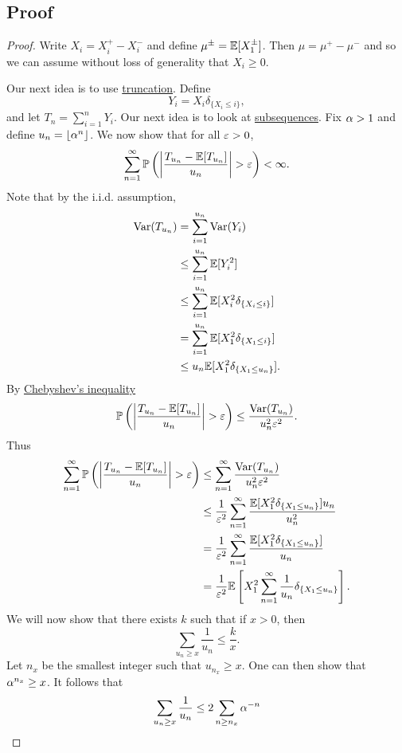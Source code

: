 \subsection{Proof}
\begin{proof}
    Write $X_i = X_i^+-X_i^-$ and define $\mu^{\pm} = {\mathbb{E}}[X_1^\pm]$. Then $\mu = \mu^+ - \mu^-$ and so we can assume without loss of generality that $X_i \ge 0$.

    Our next idea is to use \underline{truncation}. Define
    \[Y_i = X_i \delta_{\{X_i \le i\}}, \]
    and let $T_n = \sum_{i=1}^n Y_i$. Our next idea is to look at \underline{subsequences}. Fix ${\alpha} >1$ and define $u_n = \lfloor {\alpha}^n \rfloor$. We now show that for all $\varepsilon > 0$,
    \[\sum_{n=1}^\infty {\mathbb{P}}\left({\left\lvert\frac{T_{u_n}-{\mathbb{E}}[T_{u_n}]}{u_n}\right\rvert}>\varepsilon \right)< \infty. \] 
    Note that by the i.i.d. assumption,
    \begin{align*}
        \operatorname{Var}(T_{u_n})&=\sum_{i=1}^{u_n}\operatorname{Var}(Y_i)\\
        &\le \sum_{i=1}^{u_n}{\mathbb{E}}[Y_i^2]\\
        &\le \sum_{i=1}^{u_n}{\mathbb{E}}[X_i^2\delta_{\{X_i \le i\}}]\\
        &=\sum_{i=1}^{u_n}{\mathbb{E}}[X_1^2\delta_{\{X_1 \le i\}}]\\
        &\le u_n {\mathbb{E}}[X_1^2 \delta_{\{X_1\le u_n\}}].
    \end{align*}
    By \underline{Chebyshev's inequality} 
    \[{\mathbb{P}}\left({\left\lvert\frac{T_{u_n}-{\mathbb{E}}[T_{u_n}]}{u_n}\right\rvert}>\varepsilon \right) \le \frac{\operatorname{Var}(T_{u_n})}{u_n^2\varepsilon^2}. \]
    Thus 
    \begin{align*}
        \sum_{n=1}^\infty {\mathbb{P}}\left({\left\lvert\frac{T_{u_n}-{\mathbb{E}}[T_{u_n}]}{u_n}\right\rvert}>\varepsilon \right)&\le \sum_{n=1}^\infty  \frac{\operatorname{Var}(T_{u_n})}{u_n^2\varepsilon^2}\\
        &\le \frac{1}{\varepsilon^2}\sum_{n=1}^\infty \frac{{\mathbb{E}}[X_1^2\delta_{\{X_1\le u_n\}}]u_n}{u_n^2}\\
        & =  \frac{1}{\varepsilon^2}\sum_{n=1}^\infty \frac{{\mathbb{E}}[X_1^2\delta_{\{X_1\le u_n\}}]}{u_n}\\
        &=\frac{1}{\varepsilon^2}{\mathbb{E}}\left[X_1^2 \sum_{n=1}^\infty \frac{1}{u_n}\delta_{\{X_1\le u_n\}}\right].
    \end{align*}
    We will now show that there exists $k$ such that if $x > 0$, then 
    \[\sum_{u_n \ge x}\frac{1}{u_n} \le \frac{k}{x}. \]
    Let $n_x$ be the smallest integer such that $u_{n_x} \ge x$. One can then show that ${\alpha}^{n_x} \ge x$. It follows that
    \begin{align*}
        \sum_{u_n \ge x} \frac{1}{u_n} &\le 2 \sum_{n \ge n_x} \al^{-n}\\

\end{align*}
\end{proof}
